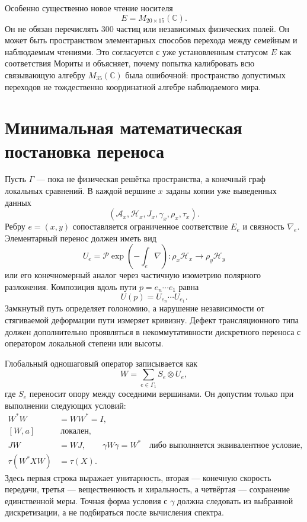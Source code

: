 Особенно существенно новое чтение носителя
\begin{equation}
 E=M_{20\times15}(\mathbb C).
\end{equation}
Он не обязан перечислять $300$ частиц или независимых физических полей.
Он может быть пространством элементарных способов перехода между
семейным и наблюдаемым чтениями. Это согласуется с уже установленным
статусом $E$ как соответствия Мориты и объясняет, почему попытка
калибровать всю связывающую алгебру $M_{35}(\mathbb C)$ была ошибочной:
пространство допустимых переходов не тождественно координатной алгебре
наблюдаемого мира.

\section{Минимальная математическая постановка переноса}

Пусть $\Gamma$ --- пока не физическая решётка пространства, а конечный
граф локальных сравнений. В каждой вершине $x$ заданы копии уже выведенных
данных
\begin{equation}
 (\mathcal A_x,\mathcal H_x,J_x,\gamma_x,\rho_x,\tau_x).
\end{equation}
Ребру $e=(x,y)$ сопоставляется ограниченное соответствие $E_e$ и связность
$\nabla_e$. Элементарный перенос должен иметь вид
\begin{equation}
 U_e=\mathcal P\exp\!\left(-\int_e\nabla\right)
 :\rho_x\mathcal H_x\longrightarrow\rho_y\mathcal H_y
 \label{eq:v5-connection-transfer}
\end{equation}
или его конечномерный аналог через частичную изометрию полярного
разложения. Композиция вдоль пути $p=e_n\cdots e_1$ равна
\begin{equation}
 U(p)=U_{e_n}\cdots U_{e_1}.
\end{equation}
Замкнутый путь определяет голономию, а нарушение независимости от
стягиваемой деформации пути измеряет кривизну. Дефект трансляционного типа
должен дополнительно проявляться в некоммутативности дискретного переноса с
оператором локальной степени или высоты.

Глобальный одношаговый оператор записывается как
\begin{equation}
 W=\sum_{e\in\Gamma_1}S_e\otimes U_e,
 \label{eq:v5-global-step}
\end{equation}
где $S_e$ переносит опору между соседними вершинами. Он допустим только при
выполнении следующих условий:
\begin{align}
 W^*W&=WW^*=I,
 \label{eq:v5-transfer-unitarity}\\
 [W,a]&\ \text{локален},\\
 JW&=WJ,\qquad \gamma W\gamma=W^*
 \quad\text{либо выполняется эквивалентное условие},\\
 \tau(W^*XW)&=\tau(X).
\end{align}
Здесь первая строка выражает унитарность, вторая --- конечную скорость
передачи, третья --- вещественность и хиральность, а четвёртая ---
сохранение единственной меры.
Точная форма условия с $\gamma$ должна следовать из выбранной дискретизации,
а не подбираться после вычисления спектра.

